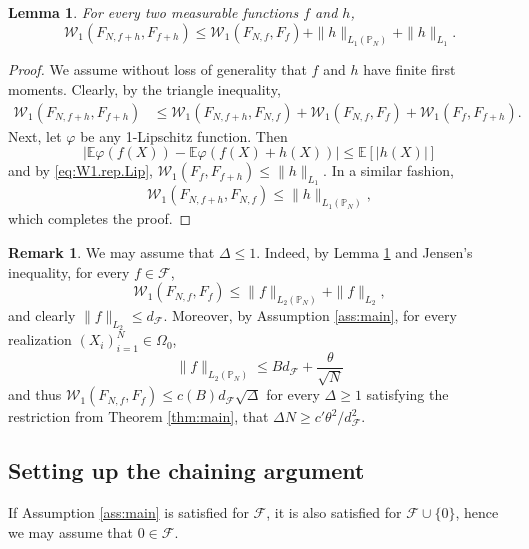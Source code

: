 \documentclass[11pt]{amsart}
\newcommand{\W}{\mathcal{W}}
\newtheorem{lemma}[theorem]{Lemma}
\theoremstyle{definition}
\newtheorem{remark}[theorem]{Remark}
\newcommand{\E}{\mathbb{E}}
\renewcommand{\P}{\mathbb{P}}
\numberwithin{equation}{section}
\begin{document}
\begin{lemma}
\label{lem:W.f.plus.h}
	For every two measurable functions $f$ and $h$,
	\[ \W_{1}(F_{N,f+h}, F_{f+h} )
	\leq  \W_{1}(F_{N,f}, F_{f} ) +  \|h\|_{L_{1}(\P_{N})} + \|h\|_{L_{1}} . \] 
\end{lemma}
\begin{proof}
We assume without loss of generality that $f$ and $h$ have finite first moments.
	Clearly, by the triangle inequality,
	\begin{align*} 
	\W_{1}(F_{N,f+h}, F_{f+h} ) 
	&\leq  \W_{1}(F_{N,f+h}, F_{N,f} ) +  \W_{1}(F_{N,f}, F_{f} ) +  \W_{1}(F_{f}, F_{f+h} ).
	\end{align*}
	Next, let $\varphi$ be any 1-Lipschitz function.
	Then 
	\[ \left| \E \varphi(f(X)) - \E  \varphi(f(X)+h(X)) \right|
	\leq \E[|h(X)|]\]
	and by   \eqref{eq:W1.rep.Lip},  $ \W_{1}(F_{f}, F_{f+h} ) \leq \|h\|_{L_1}$.
	In a similar fashion, 
	\[\W_{1}(F_{N,f+h}, F_{N,f} ) \leq \|h\|_{L_{1}(\P_{N})},\] 
	 which completes the proof.
\end{proof}


\begin{remark}
We may assume that $\Delta \leq 1$.
Indeed, by Lemma \ref{lem:W.f.plus.h} and Jensen's inequality, for every  $f\in\mathcal{F}$,
\[ \W_{1}(F_{N,f}, F_{f} )
	\leq  \|f\|_{L_{2}(\P_{N})} + \|f\|_{L_{2}}, \]
and clearly $\|f\|_{L_2}\leq d_\mathcal{F}$.
Moreover, by Assumption \ref{ass:main}, for every realization $(X_i)_{i=1}^N\in\Omega_0$,
\[\|f\|_{L_{2}(\P_{N})} \leq B d_\mathcal{F} + \frac{\theta}{\sqrt N}\]
and thus  $\W_{1}(F_{N,f}, F_{f} )\leq c(B) d_\mathcal{F}\sqrt\Delta$ for every   $\Delta\geq 1$ satisfying the restriction from Theorem \ref{thm:main}, that $\Delta N \geq c' \theta^2/d_\mathcal{F}^2 $.
\end{remark}



\subsection{Setting up the chaining argument}

If Assumption \ref{ass:main} is satisfied for $\mathcal{F}$, it is also satisfied for $\mathcal{F}\cup\{0\}$, hence we  may assume that $0\in\mathcal{F}$.
\end{document}
